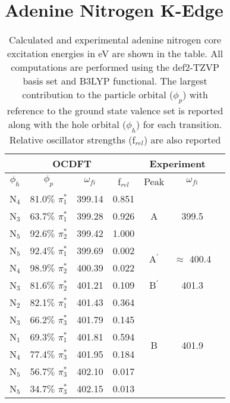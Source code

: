 \documentclass[12pt]{article}
\begin{document}
\section{Adenine Nitrogen K-Edge}
  \begin{table}[!h]
  \footnotesize
 \centering
    \caption{Calculated and experimental adenine nitrogen core excitation energies in eV are shown in the table. All computations are performed using the def2-TZVP basis set and B3LYP functional. The largest contribution to the particle orbital ($\phi_p$) with reference to the ground state valence set is reported along with the hole orbital ($\phi_h$) for each transition. Relative oscillator strengths (f$_{rel}$) are also reported}
     \begin{tabular}{c@{\hskip 0.22in}c@{\hskip 0.22in}c@{\hskip 0.22in}c@{\hskip 0.52in}c@{\hskip 0.22in}c@{\hskip 0.22in}c}
     \hline
     \hline
   \multicolumn{4}{c}{OCDFT} &\multicolumn{2}{c}{Experiment} \\
   \hline
 $\phi_h$ &  $\phi_p$ & $\omega_{fi}$ & f$_{rel}$ & Peak &  $\omega_{fi}$   \\
   \hline
    N$_4$
 &   81.0$\%$ $\pi_1^*$  & 399.14 & 0.851 & \multirow{3}{*}{A} & \multirow{3}{*}{399.5} \\
    N$_3$
 &   63.7$\%$ $\pi_1^*$  & 399.28 & 0.926 \\
    N$_5$
 &   92.6$\%$ $\pi_2^*$  & 399.42 & 1.000 
\vspace{0.1in}\\
    N$_5$
 &   92.4$\%$ $\pi_1^*$  & 399.69 & 0.002 & \multirow{2}{*}{A$^{\prime}$} & \multirow{2}{*}{$\approx$ 400.4}  \\
    N$_4$
 &   98.9$\%$ $\pi_2^*$
 & 400.39 & 0.022 
 \vspace{0.1in}\\
    N$_3$
 &   81.6$\%$ $\pi_2^*$  & 401.21 & 0.109 & B$^{\prime}$ & 401.3 
 \vspace{0.1in}\\
    N$_2$
 &   82.1$\%$ $\pi_1^*$  & 401.43 & 0.364 & \multirow{9}{*}{B} & \multirow{9}{*}{401.9}\\
    N$_3$
 &   66.2$\%$ $\pi_3^*$  & 401.79 & 0.145 \\
    N$_1$
 &   69.3$\%$ $\pi_1^*$  & 401.81 & 0.594 \\
    N$_4$
 &   77.4$\%$ $\pi_3^*$  & 401.95 & 0.184 \\
    N$_5$
 &   56.7$\%$ $\pi_3^*$  & 402.10 & 0.017 \\
    N$_5$
 &   34.7$\%$ $\pi_3^*$  & 402.15 & 0.013 \\

\end{tabular}
\end{table}
\end{document}
